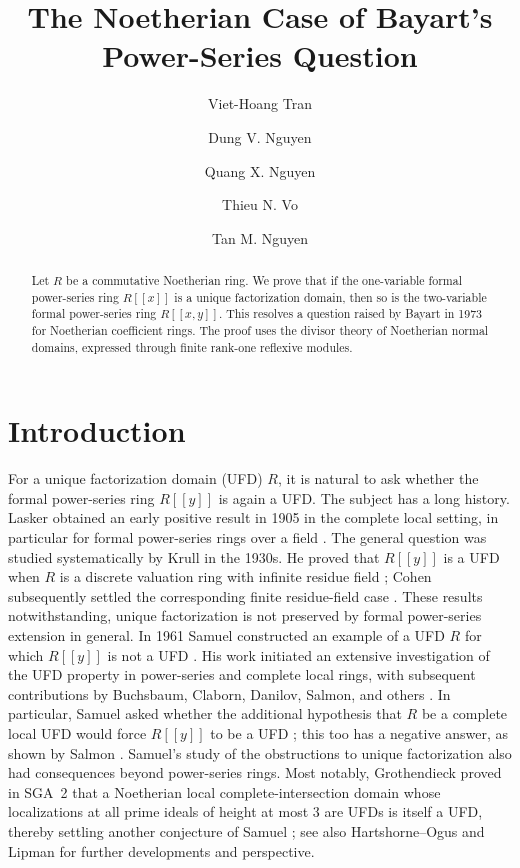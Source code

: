 \documentclass[reqno]{amsart}
\title{The Noetherian Case of Bayart's Power-Series Question}
\author{Viet-Hoang Tran}
\author{Dung V. Nguyen}
\author{Quang X. Nguyen}
\author{Thieu N. Vo}
\author{Tan M. Nguyen}
\theoremstyle{plain}
\theoremstyle{definition}
\begin{document}
\begin{abstract}
Let $R$ be a commutative Noetherian ring.  We prove that if the one-variable
formal power-series ring $R[[x]]$ is a unique factorization domain, then so is
the two-variable formal power-series ring $R[[x,y]]$.  This resolves a
question raised by Bayart in 1973 for Noetherian coefficient rings.  The proof
uses the divisor theory of Noetherian normal domains,
expressed through finite rank-one reflexive modules.
\end{abstract}

\maketitle

\section{Introduction}






For a unique factorization domain (UFD) $R$, it is natural to ask whether the formal
power-series ring $R[[y]]$ is again a UFD. The subject has a long history.
Lasker obtained an early positive result in 1905 in the complete local
setting, in particular for formal power-series rings over a field
\cite{Lasker1905}.  The general question was studied systematically by Krull
in the 1930s.  He proved that \(R[[y]]\) is a UFD when \(R\) is a discrete
valuation ring with infinite residue field \cite{Krull1938}; Cohen subsequently
settled the corresponding finite residue-field case \cite{Cohen1946}.  These
results notwithstanding, unique factorization is not preserved by formal
power-series extension in general.  In 1961 Samuel constructed an
example of a UFD \(R\) for which \(R[[y]]\) is not a UFD
\cite[\S4]{Samuel1961}.  His work initiated an extensive investigation of
the UFD property in power-series and complete local rings, with subsequent
contributions by Buchsbaum, Claborn, Danilov, Salmon, and others
\cite{Buchsbaum1961,Claborn1965,Danilov1970,Salmon1964}.  In particular,
Samuel asked whether the additional hypothesis that \(R\) be a complete local
UFD would force \(R[[y]]\) to be a UFD \cite[\S4]{Samuel1961}; this too has
a negative answer, as shown by Salmon \cite{Salmon1966}.  Samuel's study of
the obstructions to unique factorization also had consequences beyond
power-series rings.  Most notably,
Grothendieck proved in SGA~2 that a Noetherian local complete-intersection
domain whose localizations at all prime ideals of height at most \(3\) are
UFDs is itself a UFD, thereby settling another conjecture of Samuel
\cite[Expos\'e~XI, Corollaire~3.14]{SGA2}; see also Hartshorne--Ogus
\cite{HartshorneOgus1974} and
Lipman \cite{Lipman1975} for further developments and perspective.
\end{document}
